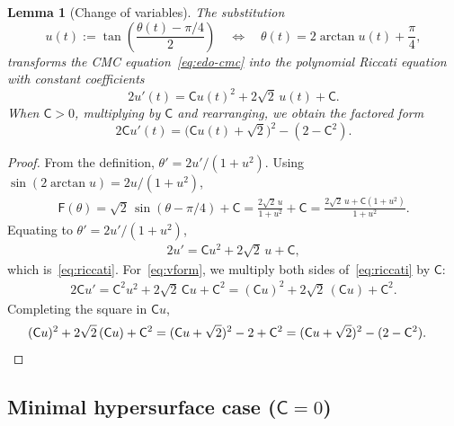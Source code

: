 \documentclass[11pt,a4paper]{amsart}
\theoremstyle{plain}
\newtheorem{lemma}[lemma]{Lemma} \aliascntresetthe{lemma}
\theoremstyle{remark}
\newcommand{\C}{\mathsf{C}}
\newcommand{\F}{\mathsf{F}}
\begin{document}
\begin{lemma}[Change of variables]\label{lem:weierstrass}
The substitution
\begin{equation}\label{eq:u-def}
u(t):=\tan\!\left(\frac{\theta(t)-\pi/4}{2}\right)
\quad\Longleftrightarrow\quad
\theta(t)=2\arctan u(t)+\frac\pi4,
\end{equation}
transforms the CMC equation~\eqref{eq:edo-cmc} into the polynomial Riccati
equation with constant coefficients
\begin{equation}\label{eq:riccati}
2u'(t)=\C u(t)^2+2\sqrt2\,u(t)+\C.
\end{equation}
When $\C>0$, multiplying by $\C$ and rearranging, we obtain the factored form
\begin{equation}\label{eq:vform}
2\C u'(t)=\bigl(\C u(t)+\sqrt2\bigr)^2-(2-\C^2).
\end{equation}
\end{lemma}

\begin{proof}
From the definition, $\theta'=2u'/(1+u^2)$. Using $\sin(2\arctan u)=2u/(1+u^2)$,
\begin{align*}
\F(\theta)=\sqrt2\,\sin(\theta-\pi/4)+\C
=\frac{2\sqrt2\,u}{1+u^2}+\C
=\frac{2\sqrt2\,u+\C(1+u^2)}{1+u^2}.
\end{align*}
Equating to $\theta'=2u'/(1+u^2)$,
\begin{align*}
2u'=\C u^2+2\sqrt2\,u+\C,
\end{align*}
which is~\eqref{eq:riccati}. For~\eqref{eq:vform}, we multiply both sides
of~\eqref{eq:riccati} by $\C$:
\begin{align*}
2\C u'=\C^2u^2+2\sqrt2\,\C u+\C^2=(\C u)^2+2\sqrt2\,(\C u)+\C^2.
\end{align*}
Completing the square in $\C u$,
\begin{align*}
(\C u)^2+2\sqrt2\,(\C u)+\C^2=(\C u+\sqrt2)^2-2+\C^2=(\C u+\sqrt2)^2-(2-\C^2).\,\,\,\,\,\,\qedhere
\end{align*}
\end{proof}







\subsection[Minimal hypersurface case]{Minimal hypersurface case ($\C=0$)}
\label{subsec:minimo}
\end{document}
